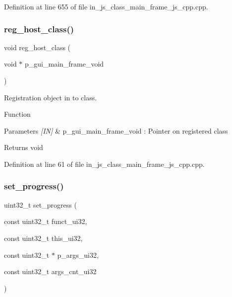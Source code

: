 Definition at line 655 of file in\+\_\+js\+\_\+class\+\_\+main\+\_\+frame\+\_\+js\+\_\+cpp.\+cpp.

\mbox{\label{group__main__frame_ga9e569b67117ef902f5a4afe4a825b678}} 
\subsubsection{reg\_host\_class()}
{\footnotesize\ttfamily void reg\+\_\+host\+\_\+class (\begin{DoxyParamCaption}\item[{void $\ast$}]{p\+\_\+gui\+\_\+main\+\_\+frame\+\_\+void }\end{DoxyParamCaption})}



Registration object in to class. 

Function
\begin{DoxyParams}{Parameters}
{\em \mbox{[}\+I\+N\mbox{]}} & p\+\_\+gui\+\_\+main\+\_\+frame\+\_\+void \+: Pointer on registered class \\
\hline
\end{DoxyParams}
\begin{DoxyReturn}{Returns}
void 
\end{DoxyReturn}


Definition at line 61 of file in\+\_\+js\+\_\+class\+\_\+main\+\_\+frame\+\_\+js\+\_\+cpp.\+cpp.

\mbox{\label{group__main__frame_ga6c9f339fd14b7f8053f4011f3900cfd2}} 
\subsubsection{set\_progress()}
{\footnotesize\ttfamily uint32\+\_\+t set\+\_\+progress (\begin{DoxyParamCaption}\item[{const uint32\+\_\+t}]{funct\+\_\+ui32,  }\item[{const uint32\+\_\+t}]{this\+\_\+ui32,  }\item[{const uint32\+\_\+t $\ast$}]{p\+\_\+args\+\_\+ui32,  }\item[{const uint32\+\_\+t}]{args\+\_\+cnt\+\_\+ui32 }\end{DoxyParamCaption})\hspace{0.3cm}{\ttfamily [static]}}



